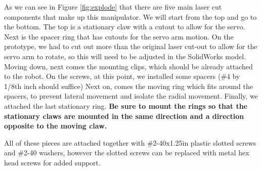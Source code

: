 As we can see in Figure \ref{fig:explode} that there are five main laser cut components that make up this manipulator. We will start from the top and go to the bottom. The top is a stationary claw with a cutout to allow for the servo. Next is the spacer ring that has cutouts for the servo arm motion. On the prototype, we had to cut out more than the original laser cut-out to allow for the servo arm to rotate, so this will need to be adjusted in the SolidWorks model. Moving down, next comes the mounting clips, which should be already attached to the robot. On the screws, at this point, we installed some spacers (\#4 by 1/8th inch should suffice) Next on, comes the moving ring which fits around the spacers, to prevent lateral movement and isolate the radial movement. Finally, we attached the last stationary ring.
\bf{}Be sure to mount the rings so that the stationary claws are mounted in the same direction and a direction opposite to the moving claw.

All of these pieces are attached together with \#2-40x1.25in plastic slotted screws and \#2-40 washers, however the slotted screws can be replaced with metal hex head screws for added support.